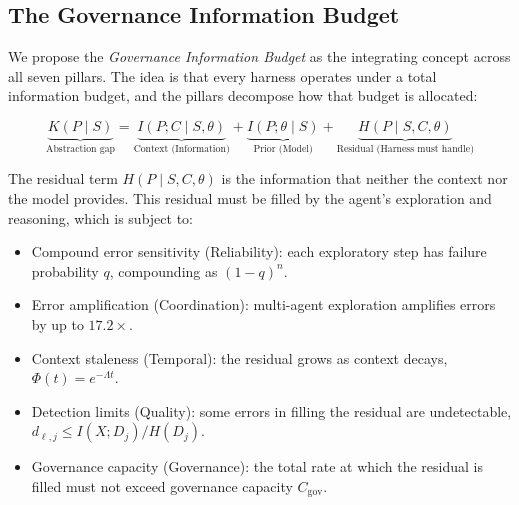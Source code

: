 \subsection{The Governance Information Budget}
\label{sec:gib}

We propose the \emph{Governance Information Budget} as the integrating concept across all seven pillars. The idea is that every harness operates under a total information budget, and the pillars decompose how that budget is allocated:

\begin{equation}
\label{eq:gib}
    \underbrace{K(P \mid S)}_{\text{Abstraction gap}} = \underbrace{I(P; C \mid S, \theta)}_{\text{Context (Information)}} + \underbrace{I(P; \theta \mid S)}_{\text{Prior (Model)}} + \underbrace{H(P \mid S, C, \theta)}_{\text{Residual (Harness must handle)}}
\end{equation}

The residual term $H(P \mid S, C, \theta)$ is the information that neither the context nor the model provides. This residual must be filled by the agent's exploration and reasoning, which is subject to:
\begin{itemize}[nosep]
    \item Compound error sensitivity (Reliability): each exploratory step has failure probability $q$, compounding as $(1-q)^n$.
    \item Error amplification (Coordination): multi-agent exploration amplifies errors by up to $17.2\times$.
    \item Context staleness (Temporal): the residual grows as context decays, $\Phi(t) = e^{-\Lambda t}$.
    \item Detection limits (Quality): some errors in filling the residual are undetectable, $d_{\ell,j} \leq I(X; D_j)/H(D_j)$.
    \item Governance capacity (Governance): the total rate at which the residual is filled must not exceed governance capacity $C_{\text{gov}}$.
\end{itemize}

